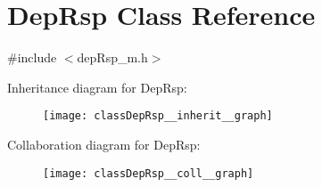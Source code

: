 \hypertarget{classDepRsp}{}\section{Dep\+Rsp Class Reference}
\label{classDepRsp}


{\ttfamily \#include $<$dep\+Rsp\+\_\+m.\+h$>$}



Inheritance diagram for Dep\+Rsp\+:\nopagebreak
\begin{figure}[H]
\begin{center}
\leavevmode
\texttt{[image: classDepRsp\_\_inherit\_\_graph]}
\end{center}
\end{figure}


Collaboration diagram for Dep\+Rsp\+:\nopagebreak
\begin{figure}[H]
\begin{center}
\leavevmode
\texttt{[image: classDepRsp\_\_coll\_\_graph]}
\end{center}
\end{figure}
